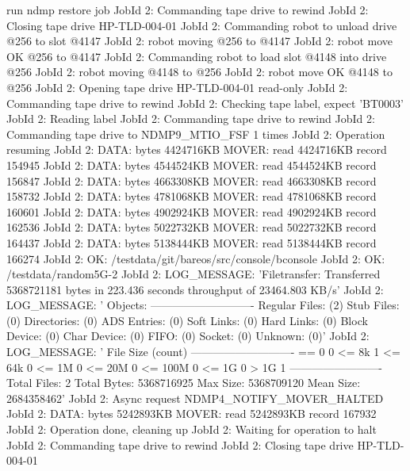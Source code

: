\begin{bconsole}{run ndmp restore job}
JobId 2: Commanding tape drive to rewind
JobId 2: Closing tape drive HP-TLD-004-01
JobId 2: Commanding robot to unload drive @256 to slot @4147
JobId 2: robot moving @256 to @4147
JobId 2: robot move OK @256 to @4147
JobId 2: Commanding robot to load slot @4148 into drive @256
JobId 2: robot moving @4148 to @256
JobId 2: robot move OK @4148 to @256
JobId 2: Opening tape drive HP-TLD-004-01 read-only
JobId 2: Commanding tape drive to rewind
JobId 2: Checking tape label, expect 'BT0003'
JobId 2: Reading label
JobId 2: Commanding tape drive to rewind
JobId 2: Commanding tape drive to NDMP9_MTIO_FSF 1 times
JobId 2: Operation resuming
JobId 2: DATA: bytes 4424716KB  MOVER: read 4424716KB record 154945
JobId 2: DATA: bytes 4544524KB  MOVER: read 4544524KB record 156847
JobId 2: DATA: bytes 4663308KB  MOVER: read 4663308KB record 158732
JobId 2: DATA: bytes 4781068KB  MOVER: read 4781068KB record 160601
JobId 2: DATA: bytes 4902924KB  MOVER: read 4902924KB record 162536
JobId 2: DATA: bytes 5022732KB  MOVER: read 5022732KB record 164437
JobId 2: DATA: bytes 5138444KB  MOVER: read 5138444KB record 166274
JobId 2: OK: /testdata/git/bareos/src/console/bconsole
JobId 2: OK: /testdata/random5G-2
JobId 2: LOG_MESSAGE: 'Filetransfer: Transferred 5368721181 bytes in 223.436 seconds throughput of 23464.803 KB/s'
JobId 2: LOG_MESSAGE: '
        Objects:
        ----------------------------
        Regular Files:          (2)
        Stub Files:             (0)
        Directories:            (0)
        ADS Entries:            (0)
        Soft Links:             (0)
        Hard Links:             (0)
        Block Device:           (0)
        Char Device:            (0)
        FIFO:                   (0)
        Socket:                 (0)
        Unknown:                (0)'
JobId 2: LOG_MESSAGE: '
        File Size (count)
        ----------------------------
        == 0                    0
        <= 8k                   1
        <= 64k                  0
        <= 1M                   0
        <= 20M                  0
        <= 100M                 0
        <= 1G                   0
         > 1G                   1
        -------------------------
        Total Files:            2
        Total Bytes:            5368716925
        Max Size:               5368709120
        Mean Size:              2684358462'
JobId 2: Async request NDMP4_NOTIFY_MOVER_HALTED
JobId 2: DATA: bytes 5242893KB  MOVER: read 5242893KB record 167932
JobId 2: Operation done, cleaning up
JobId 2: Waiting for operation to halt
JobId 2: Commanding tape drive to rewind
JobId 2: Closing tape drive HP-TLD-004-01

\end{bconsole}
